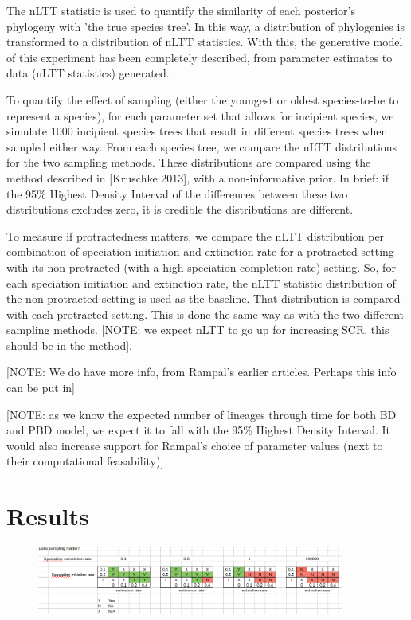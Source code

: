 \documentclass{article}
\begin{document}
The nLTT statistic is used to quantify the similarity of each posterior's phylogeny 
with 'the true species tree'. In this way, a distribution of phylogenies
is transformed to a distribution of nLTT statistics. With this, the generative
model of this experiment has been completely described, from parameter estimates
to data (nLTT statistics) generated.

To quantify the effect of sampling (either the youngest or oldest species-to-be to represent
a species), for each parameter set that allows for incipient species,
we simulate 1000 incipient species trees that result in different species trees
when sampled either way. From each species tree, we compare the nLTT distributions
for the two sampling methods. These distributions are compared 
using the method described in [Kruschke 2013], with a non-informative
prior. In brief: if the 95\% Highest Density Interval of the differences between 
these two distributions excludes zero, it is credible the distributions are different. 

To measure if protractedness matters, we compare the nLTT distribution per
combination of speciation initiation and extinction rate for a protracted
setting with its non-protracted (with a high speciation completion 
rate) setting. So, for each speciation initiation and extinction rate, 
the nLTT statistic distribution of the 
non-protracted setting is used as the baseline. That distribution is compared
with each protracted setting. This is done the same way as with the two
different sampling methods. [NOTE: we expect nLTT to go up for increasing SCR,
this should be in the method].

[NOTE: We do have more info, from Rampal's earlier articles. Perhaps this 
info can be put in]

[NOTE: as we know the expected number of lineages through time for both BD and PBD
model, we expect it to fall with the 95\% Highest Density Interval. It would also
increase support for Rampal's choice of parameter values (next to their 
computational feasability)]

\section{Results}

\begin{figure}[]
  \includegraphics[width=0.9\textwidth]{fig_does_sampling_matter.png}
\end{figure}
\end{document}
